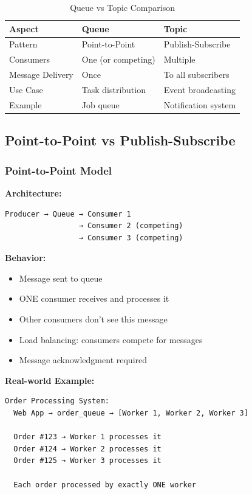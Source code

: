 \documentclass[12pt,a4paper]{article}
\begin{document}
\begin{table}[h]
\centering
\begin{tabular}{|l|l|l|}
\hline
\textbf{Aspect} & \textbf{Queue} & \textbf{Topic} \\
\hline
Pattern & Point-to-Point & Publish-Subscribe \\
Consumers & One (or competing) & Multiple \\
Message Delivery & Once & To all subscribers \\
Use Case & Task distribution & Event broadcasting \\
Example & Job queue & Notification system \\
\hline
\end{tabular}
\caption{Queue vs Topic Comparison}
\end{table}


\subsection{Point-to-Point vs Publish-Subscribe}

\subsubsection{Point-to-Point Model}

\textbf{Architecture:}
\begin{verbatim}
Producer → Queue → Consumer 1
                 → Consumer 2 (competing)
                 → Consumer 3 (competing)
\end{verbatim}

\textbf{Behavior:}
\begin{itemize}
    \item Message sent to queue
    \item ONE consumer receives and processes it
    \item Other consumers don't see this message
    \item Load balancing: consumers compete for messages
    \item Message acknowledgment required
\end{itemize}

\textbf{Real-world Example:}
\begin{verbatim}
Order Processing System:
  Web App → order_queue → [Worker 1, Worker 2, Worker 3]
  
  Order #123 → Worker 1 processes it
  Order #124 → Worker 2 processes it
  Order #125 → Worker 3 processes it
  
  Each order processed by exactly ONE worker
\end{verbatim}
\end{document}
